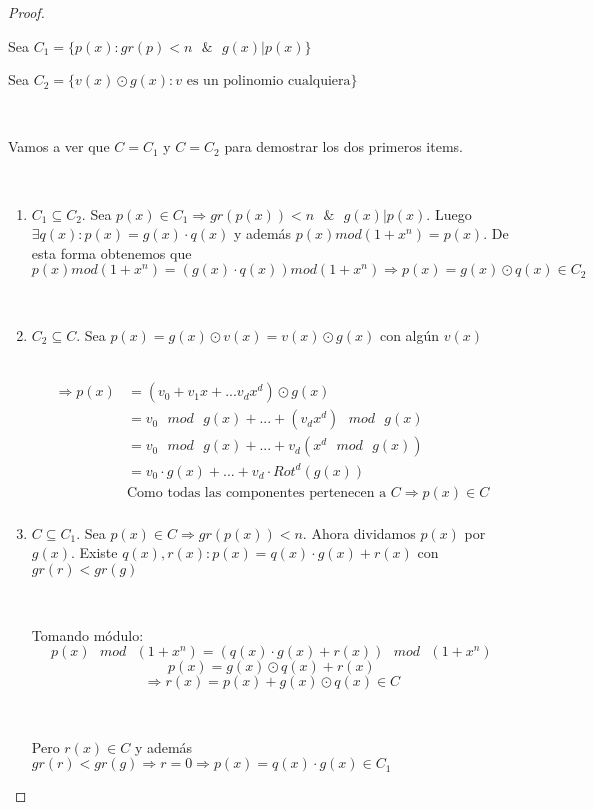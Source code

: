 \documentclass[11pt]{article}
\begin{document}
\begin{proof} \par
\

Sea $C_1 =  \{p(x): gr(p) < n \text{ } \& \text{ }  g(x)|p(x)\}$
\

Sea $C_2 = \{v(x) \odot g(x):  \text{$v$ es un polinomio cualquiera} \}$\par
\

Vamos a ver que $C = C_1$ y $C = C_2$ para demostrar los dos primeros items.\par
\

\begin{enumerate}
\item $C_1 \subseteq C_2$. Sea $p(x) \in C_1 \Rightarrow gr(p(x)) < n \text{ } \& \text{ } g(x) | p(x)$. Luego $\exists q(x): p(x) = g(x)\cdot q(x)$ y además $p(x) mod (1 + x^{n}) = p(x)$. De esta forma obtenemos que  $p(x) mod (1 + x^{n}) =  (g(x)\cdot q(x)) mod (1 + x^{n}) \Rightarrow p(x) = g(x) \odot q(x) \in C_2 $\par
\

\item $C_2 \subseteq C$. Sea  $p(x) = g(x) \odot v(x) =  v(x) \odot g(x)$ con algún $v(x)$\par
\
\begin{align*}
\Rightarrow p(x) & = (v_0 + v_1x + ... v_dx^{d}) \odot g(x) \\
			 & = v_0 \text{ } mod \text{ } g(x) + ... + (v_dx^{d}) \text{ } mod \text{ } g(x)\\
			 & = v_0 \text{ } mod \text{ } g(x) + ... + v_d(x^{d} \text{ } mod \text{ } g(x))\\
			 & = v_0 \cdot g(x) + ... + v_d \cdot Rot^{d}(g(x))\\
			 & \text{Como todas las componentes pertenecen a } C \Rightarrow p(x) \in C\\
\end{align*}

\item $C \subseteq C_1$. Sea $p(x) \in C \Rightarrow gr(p(x)) < n$. Ahora dividamos $p(x)$ por $g(x)$. Existe $q(x), r(x): p(x) = q(x) \cdot g(x) + r(x)$ con $gr(r) < gr(g)$\par
\

Tomando módulo: \[ p(x) \text{ } mod \text{ } (1 + x^{n}) =  (q(x) \cdot g(x) + r(x)) \text{ }  mod \text{ } (1 + x^{n}) \] \[ p(x) = g(x) \odot q(x) + r(x)\] \[ \Rightarrow r(x) = p(x) +  g(x) \odot q(x) \in C\] \par
\

Pero $r(x) \in C$ y además $gr(r) < gr(g) \Rightarrow r = 0 \Rightarrow p(x) = q(x) \cdot g(x) \in C_1$


\end{enumerate}
\end{proof}
\end{document}
